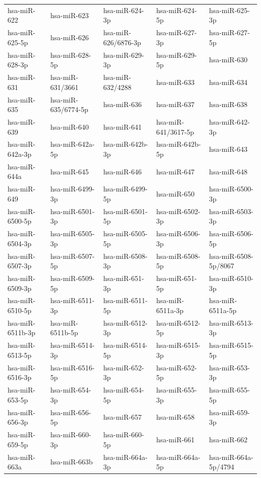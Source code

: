 \begin{longtable}{lllll}
hsa-miR-622 & hsa-miR-623 & hsa-miR-624-3p & hsa-miR-624-5p & hsa-miR-625-3p \\
hsa-miR-625-5p & hsa-miR-626 & hsa-miR-626/6876-3p & hsa-miR-627-3p & hsa-miR-627-5p \\
hsa-miR-628-3p & hsa-miR-628-5p & hsa-miR-629-3p & hsa-miR-629-5p & hsa-miR-630 \\
hsa-miR-631 & hsa-miR-631/3661 & hsa-miR-632/4288 & hsa-miR-633 & hsa-miR-634 \\
hsa-miR-635 & hsa-miR-635/6774-5p & hsa-miR-636 & hsa-miR-637 & hsa-miR-638 \\
hsa-miR-639 & hsa-miR-640 & hsa-miR-641 & hsa-miR-641/3617-5p & hsa-miR-642-3p \\
hsa-miR-642a-3p & hsa-miR-642a-5p & hsa-miR-642b-3p & hsa-miR-642b-5p & hsa-miR-643 \\
hsa-miR-644a & hsa-miR-645 & hsa-miR-646 & hsa-miR-647 & hsa-miR-648 \\
hsa-miR-649 & hsa-miR-6499-3p & hsa-miR-6499-5p & hsa-miR-650 & hsa-miR-6500-3p \\
hsa-miR-6500-5p & hsa-miR-6501-3p & hsa-miR-6501-5p & hsa-miR-6502-3p & hsa-miR-6503-3p \\
hsa-miR-6504-3p & hsa-miR-6505-3p & hsa-miR-6505-5p & hsa-miR-6506-3p & hsa-miR-6506-5p \\
hsa-miR-6507-3p & hsa-miR-6507-5p & hsa-miR-6508-3p & hsa-miR-6508-5p & hsa-miR-6508-5p/8067 \\
hsa-miR-6509-3p & hsa-miR-6509-5p & hsa-miR-651-3p & hsa-miR-651-5p & hsa-miR-6510-3p \\
hsa-miR-6510-5p & hsa-miR-6511-3p & hsa-miR-6511-5p & hsa-miR-6511a-3p & hsa-miR-6511a-5p \\
hsa-miR-6511b-3p & hsa-miR-6511b-5p & hsa-miR-6512-3p & hsa-miR-6512-5p & hsa-miR-6513-3p \\
hsa-miR-6513-5p & hsa-miR-6514-3p & hsa-miR-6514-5p & hsa-miR-6515-3p & hsa-miR-6515-5p \\
hsa-miR-6516-3p & hsa-miR-6516-5p & hsa-miR-652-3p & hsa-miR-652-5p & hsa-miR-653-3p \\
hsa-miR-653-5p & hsa-miR-654-3p & hsa-miR-654-5p & hsa-miR-655-3p & hsa-miR-655-5p \\
hsa-miR-656-3p & hsa-miR-656-5p & hsa-miR-657 & hsa-miR-658 & hsa-miR-659-3p \\
hsa-miR-659-5p & hsa-miR-660-3p & hsa-miR-660-5p & hsa-miR-661 & hsa-miR-662 \\
hsa-miR-663a & hsa-miR-663b & hsa-miR-664a-3p & hsa-miR-664a-5p & hsa-miR-664a-5p/4794 \\

\end{longtable}
